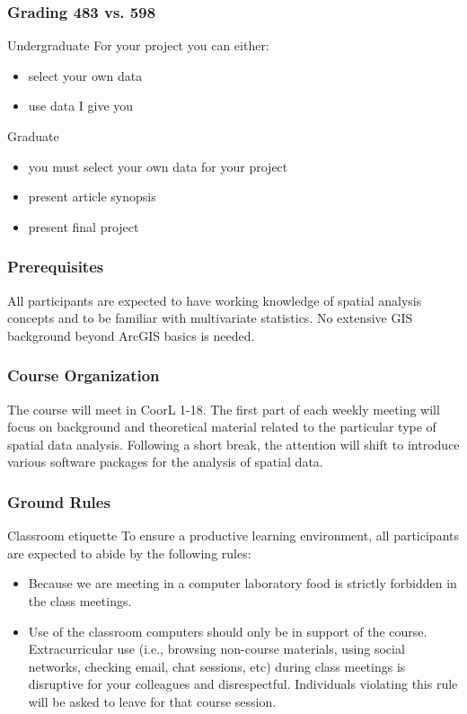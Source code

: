 \documentclass[nototal]{beamer}
\begin{document}
\begin{frame}
	\frametitle{Grading 483 vs. 598}
 
\begin{block}{Undergraduate}
  For your project you can either:
 \begin{itemize}
 \item  select your own data
 \item  use data I give you
 \end{itemize}
 \end{block} 
\begin{block}{Graduate}
 \begin{itemize}
 \item  you must select your own data for your project
 \item  present article synopsis
 \item  present final project
 \end{itemize}
 \end{block} 
 \end{frame}

\begin{frame}
	\frametitle{Prerequisites}
  All participants are expected to have  working knowledge of spatial
  analysis concepts and to be familiar with multivariate statistics. No
  extensive GIS background beyond ArcGIS basics is needed.
 \end{frame} 

\begin{frame}
	\frametitle{Course Organization}

The course will meet in CoorL 1-18. The first part of each
weekly meeting will focus on background and theoretical material related to
the particular type of spatial data analysis. Following a short break, the
attention will shift to introduce various software packages for the analysis
of spatial data.
 \end{frame} 

 \begin{frame}
   \frametitle{Ground Rules}
   \begin{block}{Classroom etiquette}
      To ensure a productive learning environment, all
participants are expected to abide by the following rules:
\begin{itemize}
  \item Because we are meeting in a computer laboratory
food is strictly forbidden in the class meetings.
\item Use of the classroom computers should only be in support of the course.
  Extracurricular use (i.e., browsing non-course materials, using  social networks, checking
  email, chat sessions, etc) during class meetings is disruptive for your colleagues and
  disrespectful. Individuals violating this rule will be asked to leave for
  that course session.
\end{itemize}

    \end{block}
  \end{frame}
\end{document}
